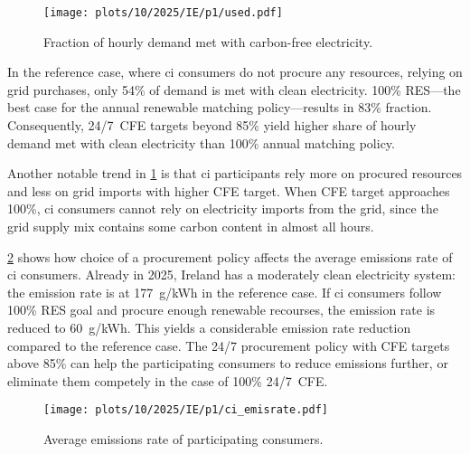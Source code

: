 \begin{figure}
    \centering
    \texttt{[image: plots/10/2025/IE/p1/used.pdf]}
    \caption{Fraction of hourly demand met with carbon-free electricity.}
    \label{fig:10-2025-IE-p1-used}
\end{figure}

In the reference case, where \gls{ci} consumers do not procure any resources, relying on grid purchases, only 54\% of demand is met with clean electricity.
100\% RES---the best case for the annual renewable matching policy---results in 83\% fraction. 
Consequently, 24/7~CFE targets beyond 85\% yield higher share of hourly demand met with clean electricity than 100\% annual matching policy.

Another notable trend in \cref{fig:10-2025-IE-p1-used} is that \gls{ci} participants rely more on procured resources and less on grid imports with higher CFE target.
When CFE target approaches 100\%, \gls{ci} consumers cannot rely on electricity imports from the grid, since the grid supply mix contains some carbon content in almost all hours.

\cref{fig:10-2025-IE-p1-ci_emisrate} shows how choice of a procurement policy affects the average emissions rate of \gls{ci} consumers.
Already in 2025, Ireland has a moderately clean electricity system: the emission rate is at 177~g\co/kWh in the reference case. 
If \gls{ci} consumers follow 100\% RES goal and procure enough renewable recourses, the emission rate is reduced to 60~g\co/kWh.
This yields a considerable emission rate reduction compared to the reference case.
The 24/7 procurement policy with CFE targets above 85\% can help the participating consumers to reduce emissions further, or eliminate them competely in the case of 100\% 24/7~CFE.

\begin{figure}
    \centering
    \texttt{[image: plots/10/2025/IE/p1/ci\_emisrate.pdf]}
    \caption{Average emissions rate of participating consumers.}
    \label{fig:10-2025-IE-p1-ci_emisrate}
\end{figure}

